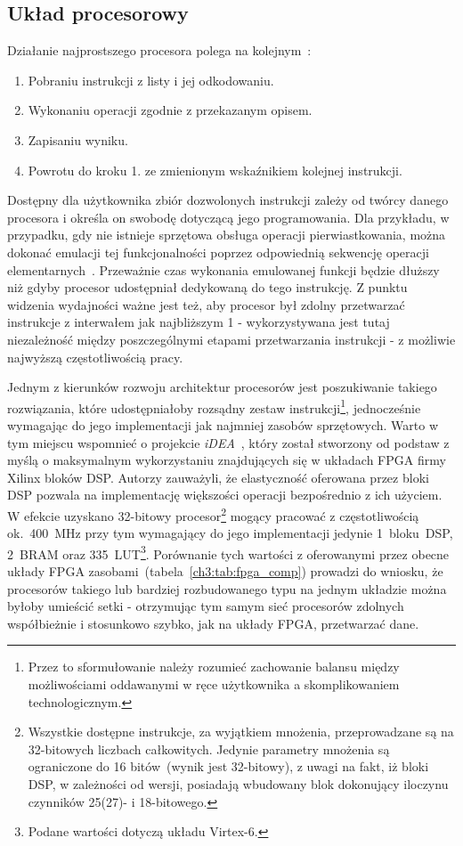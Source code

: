 \subsection{Układ procesorowy}
Działanie najprostszego procesora polega na kolejnym~\cite{RISCV}:
\begin{enumerate}
\item Pobraniu instrukcji z listy i jej odkodowaniu.
\item Wykonaniu operacji zgodnie z przekazanym opisem.
\item Zapisaniu wyniku.
\item Powrotu do kroku 1. ze zmienionym wskaźnikiem kolejnej instrukcji.
\end{enumerate}
Dostępny dla użytkownika zbiór dozwolonych instrukcji zależy od twórcy danego procesora i określa on swobodę dotyczącą jego programowania. Dla przykładu, w przypadku, gdy nie istnieje sprzętowa obsługa operacji pierwiastkowania, można dokonać emulacji tej funkcjonalności poprzez odpowiednią sekwencję operacji elementarnych~\cite{FAST_INV_SQRT}. Przeważnie czas wykonania emulowanej funkcji będzie dłuższy niż gdyby procesor udostępniał dedykowaną do tego instrukcję. Z punktu widzenia wydajności ważne jest też, aby procesor był zdolny przetwarzać instrukcje z interwałem jak najbliższym 1 - wykorzystywana jest tutaj niezależność między poszczególnymi etapami przetwarzania instrukcji - z  możliwie najwyższą częstotliwością pracy. 

Jednym z kierunków rozwoju architektur procesorów jest poszukiwanie takiego rozwiązania, które udostępniałoby rozsądny zestaw instrukcji\footnote{Przez to sformułowanie należy rozumieć zachowanie balansu między możliwościami oddawanymi w ręce użytkownika a skomplikowaniem technologicznym.}, jednocześnie wymagając do jego implementacji jak najmniej zasobów sprzętowych. Warto w tym miejscu wspomnieć o projekcie \textit{iDEA}~\cite{iDEA}, który został stworzony od podstaw z myślą o maksymalnym wykorzystaniu znajdujących się w układach FPGA firmy Xilinx bloków DSP. Autorzy zauważyli, że elastyczność oferowana przez bloki DSP pozwala na implementację większości operacji bezpośrednio z ich użyciem. W efekcie uzyskano 32-bitowy procesor\footnote{Wszystkie dostępne instrukcje, za wyjątkiem mnożenia, przeprowadzane są na 32-bitowych liczbach całkowitych. Jedynie parametry mnożenia są ograniczone do 16 bitów~(wynik jest 32-bitowy), z uwagi na fakt, iż bloki DSP, w zależności od wersji, posiadają wbudowany blok dokonujący iloczynu czynników 25(27)- i 18-bitowego.} mogący pracować z częstotliwością ok.~400~MHz przy tym wymagający do jego implementacji jedynie 1~bloku~DSP, 2~BRAM oraz 335~LUT\footnote{Podane wartości dotyczą układu Virtex-6.}. Porównanie tych wartości z oferowanymi przez obecne układy FPGA zasobami~(tabela~\ref{ch3:tab:fpga_comp})  prowadzi do wniosku, że procesorów takiego lub bardziej rozbudowanego typu na jednym układzie można byłoby umieścić setki - otrzymując tym samym sieć procesorów zdolnych współbieżnie i stosunkowo szybko, jak na układy FPGA, przetwarzać dane. 

